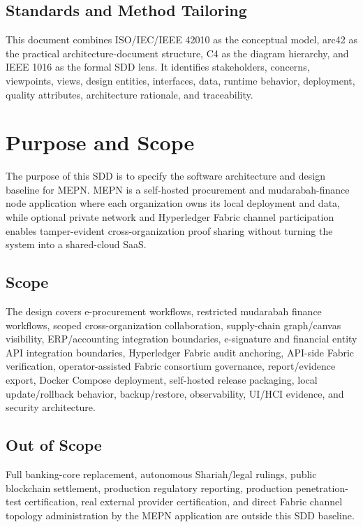 \documentclass[11pt,a4paper]{article}
\newcommand{\codename}{MEPN}
\begin{document}
\subsection*{Standards and Method Tailoring}
This document combines ISO/IEC/IEEE 42010 as the conceptual model, arc42 as the practical architecture-document structure, C4 as the diagram hierarchy, and IEEE 1016 as the formal SDD lens. It identifies stakeholders, concerns, viewpoints, views, design entities, interfaces, data, runtime behavior, deployment, quality attributes, architecture rationale, and traceability.

\section{Purpose and Scope}
The purpose of this SDD is to specify the software architecture and design baseline for \codename{}. MEPN is a self-hosted procurement and mudarabah-finance node application where each organization owns its local deployment and data, while optional private network and Hyperledger Fabric channel participation enables tamper-evident cross-organization proof sharing without turning the system into a shared-cloud SaaS.

\subsection{Scope}
The design covers e-procurement workflows, restricted mudarabah finance workflows, scoped cross-organization collaboration, supply-chain graph/canvas visibility, ERP/accounting integration boundaries, e-signature and financial entity API integration boundaries, Hyperledger Fabric audit anchoring, API-side Fabric verification, operator-assisted Fabric consortium governance, report/evidence export, Docker Compose deployment, self-hosted release packaging, local update/rollback behavior, backup/restore, observability, UI/HCI evidence, and security architecture.

\subsection{Out of Scope}
Full banking-core replacement, autonomous Shariah/legal rulings, public blockchain settlement, production regulatory reporting, production penetration-test certification, real external provider certification, and direct Fabric channel topology administration by the MEPN application are outside this SDD baseline.
\end{document}
